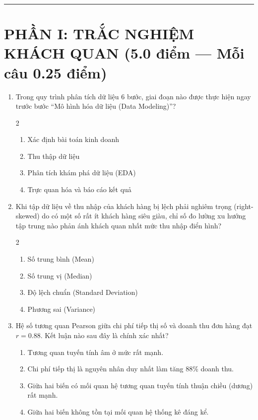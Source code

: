 \documentclass[11pt,a4paper]{article}
\begin{document}
\vspace{-3mm}
\hrule
\vspace{1.5mm}

\section*{PHẦN I: TRẮC NGHIỆM KHÁCH QUAN (5.0 điểm --- Mỗi câu 0.25 điểm)}

\begin{enumerate}[leftmargin=*,itemsep=2pt]

\item Trong quy trình phân tích dữ liệu 6 bước, giai đoạn nào được thực hiện ngay trước bước ``Mô hình hóa dữ liệu (Data Modeling)''?
\begin{multicols}{2}
\begin{enumerate}[label=\Alph*.]
  \item Xác định bài toán kinh doanh
  \item Thu thập dữ liệu
  \item Phân tích khám phá dữ liệu (EDA)
  \item Trực quan hóa và báo cáo kết quả
\end{enumerate}
\end{multicols}

\item Khi tập dữ liệu về thu nhập của khách hàng bị lệch phải nghiêm trọng (right-skewed) do có một số rất ít khách hàng siêu giàu, chỉ số đo lường xu hướng tập trung nào phản ánh khách quan nhất mức thu nhập điển hình?
\begin{multicols}{2}
\begin{enumerate}[label=\Alph*.]
  \item Số trung bình (Mean)
  \item Số trung vị (Median)
  \item Độ lệch chuẩn (Standard Deviation)
  \item Phương sai (Variance)
\end{enumerate}
\end{multicols}

\item Hệ số tương quan Pearson giữa chi phí tiếp thị số và doanh thu đơn hàng đạt $r = 0.88$. Kết luận nào sau đây là chính xác nhất?
\begin{enumerate}[label=\Alph*.]
  \item Tương quan tuyến tính âm ở mức rất mạnh.
  \item Chi phí tiếp thị là nguyên nhân duy nhất làm tăng 88\% doanh thu.
  \item Giữa hai biến có mối quan hệ tương quan tuyến tính thuận chiều (dương) rất mạnh.
  \item Giữa hai biến không tồn tại mối quan hệ thống kê đáng kể.
\end{enumerate}


\end{enumerate}
\end{document}
